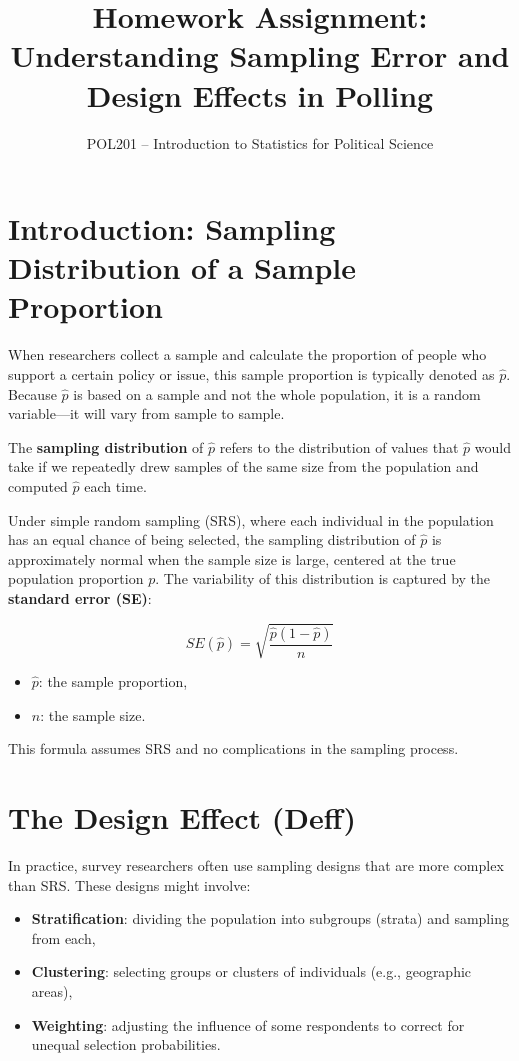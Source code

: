 \documentclass[12pt]{article}
\title{Homework Assignment: Understanding Sampling Error and Design Effects in Polling}
\author{POL201 – Introduction to Statistics for Political Science}
\date{}
\begin{document}
\maketitle

\section*{Introduction: Sampling Distribution of a Sample Proportion}

When researchers collect a sample and calculate the proportion of people who support a certain policy or issue, this sample proportion is typically denoted as \(\hat{p}\). Because \(\hat{p}\) is based on a sample and not the whole population, it is a random variable—it will vary from sample to sample.

The \textbf{sampling distribution} of \(\hat{p}\) refers to the distribution of values that \(\hat{p}\) would take if we repeatedly drew samples of the same size from the population and computed \(\hat{p}\) each time.

Under simple random sampling (SRS), where each individual in the population has an equal chance of being selected, the sampling distribution of \(\hat{p}\) is approximately normal when the sample size is large, centered at the true population proportion \(p\). The variability of this distribution is captured by the \textbf{standard error (SE)}:

\[
SE(\hat{p}) = \sqrt{ \frac{ \hat{p}(1 - \hat{p}) }{n} }
\]

\begin{itemize}
  \item \(\hat{p}\): the sample proportion,
  \item \(n\): the sample size.
\end{itemize}

This formula assumes SRS and no complications in the sampling process.

\section*{The Design Effect (Deff)}

In practice, survey researchers often use sampling designs that are more complex than SRS. These designs might involve:
\begin{itemize}
  \item \textbf{Stratification}: dividing the population into subgroups (strata) and sampling from each,
  \item \textbf{Clustering}: selecting groups or clusters of individuals (e.g., geographic areas),
  \item \textbf{Weighting}: adjusting the influence of some respondents to correct for unequal selection probabilities.
\end{itemize}
\end{document}
